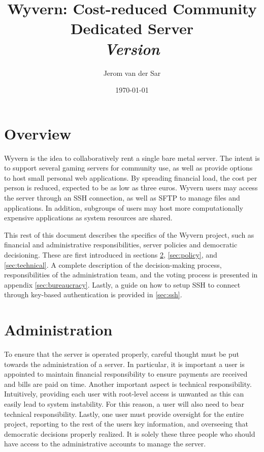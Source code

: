 \documentclass[a4paper]{article}
\title{Wyvern: Cost-reduced Community Dedicated Server\\\normalsize \textit{Version \versionnumber}}
\author{Jerom van der Sar}
\date{\today}
\begin{document}
\begin{titlepage}
    \maketitle
\end{titlepage}

\tableofcontents
\newpage

\section{Overview}
Wyvern is the idea to collaboratively rent a single bare metal server. The intent is to support several gaming servers for community use, as well as provide options to host small personal web applications. By spreading financial load, the cost per person is reduced, expected to be as low as three euros. Wyvern users may access the server through an SSH connection, as well as SFTP to manage files and applications. In addition, subgroups of users may host more computationally expensive applications as system resources are shared.

This rest of this document describes the specifics of the Wyvern project, such as financial and administrative responsibilities, server policies and democratic decisioning. These are first introduced in sections \ref{sec:administration}, \ref{sec:policy}, and \ref{sec:technical}. A complete description of the decision-making process, responsibilities of the administration team, and the voting process is presented in appendix \ref{sec:bureaucracy}. Lastly, a guide on how to setup SSH to connect through key-based authentication is provided in \ref{sec:ssh}.

\section{Administration}
\label{sec:administration}
To ensure that the server is operated properly, careful thought must be put towards the administration of a server. In particular, it is important a user is appointed to maintain financial responsibility to ensure payments are received and bills are paid on time. Another important aspect is technical responsibility. Intuitively, providing each user with root-level access is unwanted as this can easily lead to system instability. For this reason, a user will also need to bear technical responsibility. Lastly, one user must provide oversight for the entire project, reporting to the rest of the users key information, and overseeing that democratic decisions properly realized. It is solely these three people who should have access to the administrative accounts to manage the server.
\end{document}

